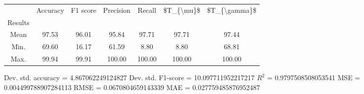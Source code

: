 \begin{tabular}{|c|c|c|c|c|c|c|}
\toprule
{} &  Accuracy &  F1 score &  Precision &  Recall &  \$T\_\{\textbackslash mu\}\$ &  \$T\_\{\textbackslash gamma\}\$ \\
Results &           &           &            &         &            &               \\
\hline
Mean    &     97.53 &     96.01 &      95.84 &   97.71 &      97.71 &         97.44 \\
Min.    &     69.60 &     16.17 &      61.59 &    8.80 &       8.80 &         68.81 \\
Max.    &     99.94 &     99.91 &     100.00 &  100.00 &     100.00 &        100.00 \\
\bottomrule
\end{tabular}

 Dev. std. accuracy = 4.867062249124827
 Dev. std. F1-score = 10.097711952217217
 $R^2$ = 0.9797508508053541
 MSE = 0.004499788907284113
 RMSE = 0.0670804659143339
 MAE = 0.027759485876952487
